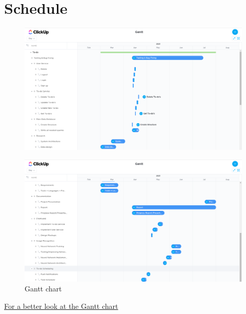 \documentclass[12pt]{paper}
\begin{document}
	\section{Schedule}
	\begin{figure}[h]
		\centering
		\includegraphics[width=150mm,scale=0.5]{./images/gantt-chart-1.png}
	\end{figure}
	\begin{figure}[!h]
		\centering
		\includegraphics[width=150mm,scale=0.5]{./images/gantt-chart-2.png}
		\caption{Gantt chart}
	\end{figure}
	\href{https://share.clickup.com/g/h/4g659-29/c4e331e430e363e}{For a better look at the Gantt chart}
	\pagebreak
	
	
\end{document}
